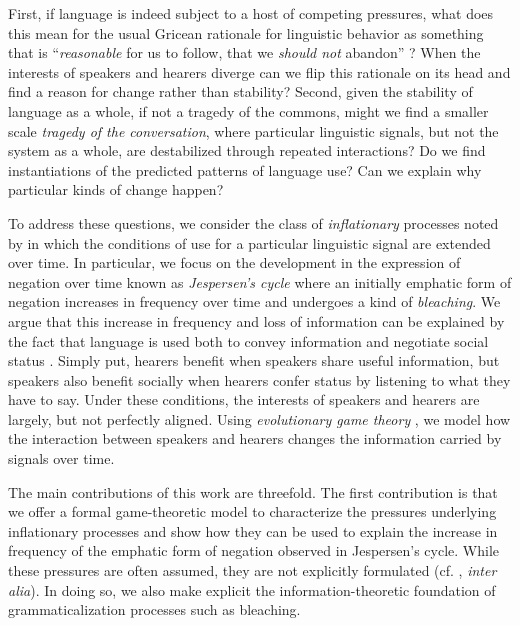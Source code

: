 \documentclass[linguex]{sp}
\theoremstyle{definition} \newtheorem{definition}{Definition}
\begin{document}
First, if language is indeed subject to a host of competing pressures, what does this mean for the usual Gricean rationale for linguistic behavior as something that is ``\emph{reasonable} for us to follow, that we \emph{should not} abandon'' \citep[29]{grice1975}? When the interests of speakers and hearers diverge can we flip this rationale on its head and find a reason for change rather than stability? Second, given the stability of language as a whole, if not a tragedy of the commons, might we find a smaller scale \emph{tragedy of the conversation}, where particular linguistic signals, but not the system as a whole, are destabilized through repeated interactions? Do we find instantiations of the predicted patterns of language use? Can we explain why particular kinds of change happen?

To address these questions, we consider the class of \emph{inflationary} processes noted by \cite{dahl:2001} in which the conditions of use for a particular linguistic signal are extended over time. In particular, we focus on the development in the expression of negation over time known as \emph{Jespersen's cycle}  \citeyearpar{jespersen:1917} where an initially emphatic form of negation increases in frequency over time and undergoes a kind of \emph{bleaching}.  We argue that this increase in frequency and loss of information can be explained by the fact that language is used both to convey information and negotiate social status \citep{dessalles2007,franke-etal:2012}. Simply put, hearers benefit when speakers share useful information, but  speakers also benefit socially when hearers confer status by listening to what they have to say. Under these conditions, the interests of speakers and hearers are largely, but not perfectly aligned. Using \emph{evolutionary game theory} \citep{maynard-smith1982}, we model how the interaction between speakers and hearers changes the information carried by signals over time.

The main contributions of this work are threefold. The first contribution is that we offer a formal game-theoretic model to characterize the pressures underlying inflationary processes and show how they can be used to explain the increase in frequency of the emphatic form of negation observed in Jespersen's cycle. While these pressures are often assumed, they are not explicitly formulated (cf. \citealt{detges-waltereit2002, hopper-traugottt2003, kiparsky-condoravdi:2006}, \emph{inter alia}). In doing so, we also make explicit the information-theoretic foundation of grammaticalization processes such as bleaching. 
\end{document}
